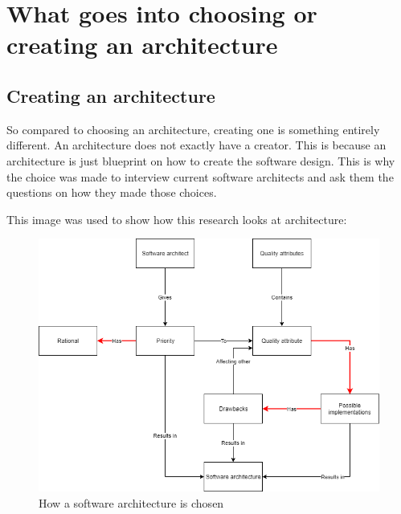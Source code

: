 \section{What goes into choosing or creating an architecture}

\subsection{Creating an architecture}

So compared to choosing an architecture, creating one is something entirely different. An architecture does not exactly have a creator. This is because an architecture is just blueprint on how to create the software design. This is why the choice was made to interview current software architects and ask them the questions on how they made those choices.

This image was used to show how this research looks at architecture:

\begin{figure}[H]
	\includegraphics[width=\linewidth]{creating_architecture.png}
	\caption{How a software architecture is chosen}
\end{figure}
